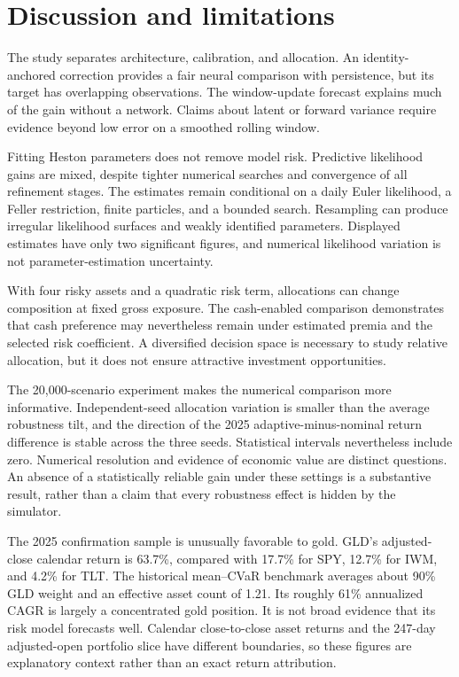 \section{Discussion and limitations}
The study separates architecture, calibration, and allocation. An identity-anchored correction provides a fair neural comparison with persistence, but its target has overlapping observations. The window-update forecast explains much of the gain without a network. Claims about latent or forward variance require evidence beyond low error on a smoothed rolling window.

Fitting Heston parameters does not remove model risk. Predictive likelihood gains are mixed, despite tighter numerical searches and convergence of all refinement stages. The estimates remain conditional on a daily Euler likelihood, a Feller restriction, finite particles, and a bounded search. Resampling can produce irregular likelihood surfaces and weakly identified parameters. Displayed estimates have only two significant figures, and numerical likelihood variation is not parameter-estimation uncertainty.

With four risky assets and a quadratic risk term, allocations can change composition at fixed gross exposure. The cash-enabled comparison demonstrates that cash preference may nevertheless remain under estimated premia and the selected risk coefficient. A diversified decision space is necessary to study relative allocation, but it does not ensure attractive investment opportunities.

The 20,000-scenario experiment makes the numerical comparison more informative. Independent-seed allocation variation is smaller than the average robustness tilt, and the direction of the 2025 adaptive-minus-nominal return difference is stable across the three seeds. Statistical intervals nevertheless include zero. Numerical resolution and evidence of economic value are distinct questions. An absence of a statistically reliable gain under these settings is a substantive result, rather than a claim that every robustness effect is hidden by the simulator.

The 2025 confirmation sample is unusually favorable to gold. GLD's adjusted-close calendar return is 63.7\%, compared with 17.7\% for SPY, 12.7\% for IWM, and 4.2\% for TLT. The historical mean--CVaR benchmark averages about 90\% GLD weight and an effective asset count of 1.21. Its roughly 61\% annualized CAGR is largely a concentrated gold position. It is not broad evidence that its risk model forecasts well. Calendar close-to-close asset returns and the 247-day adjusted-open portfolio slice have different boundaries, so these figures are explanatory context rather than an exact return attribution.

